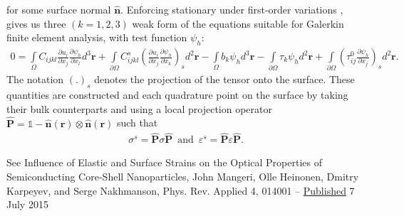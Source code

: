 \documentclass[16pt]{article} %
\begin{document}
%
for some surface normal $\mathbf{\hat{n}}$.
%
Enforcing stationary under first-order variations \cite{BowerBook}, gives us three $(k = 1,2,3)$ weak form of the equations suitable for Galerkin finite element analysis, with test function $\psi_h$:
%
\begin{align}\tag{3.8}
 0 = \int\limits_\Omega C_{ijkl} \frac{\partial u_i}{\partial x_j} \frac{\partial \psi_h}{\partial x_l} d^3 \textbf{r} + \int\limits_{\partial \Omega} C_{ijkl}^s \left(\frac{\partial u_i}{\partial x_j} \frac{\partial \psi_h}{\partial x_k} \right)_s d^2 \textbf{r} - \int\limits_\Omega b_k \psi_h d^3 \textbf{r} - \int\limits_{\partial \Omega} \tau_k \psi_h d^2 \textbf{r} + \int\limits_{\partial \Omega} \left(\tau_{ij}^0 \frac{\partial \psi_h}{\partial x_j} \right)_s d^2 \textbf{r}.
\end{align}
%
The notation $\left( . \right)_s$ denotes the projection of the tensor onto the surface.
%
These quantities are constructed and each quadrature point on the surface by taking their bulk counterparts and using a local projection operator $\mathbf{\hat{\textbf{P}}} = \mathds{1} - \mathbf{\hat{n}}(\textbf{r}) \otimes \mathbf{\hat{n}} (\textbf{r})$ \cite{Yvonnet2012} such that 
%
\begin{align}\tag{3.9}
\sigma^s = \mathbf{\hat{\textbf{P}}} \sigma \mathbf{\hat{\textbf{P}}} \,\,\,\mathrm{and}\,\,\, \varepsilon^s = \mathbf{\hat{\textbf{P}}} \varepsilon \mathbf{\hat{\textbf{P}}}.
\end{align}

See Influence of Elastic and Surface Strains on the Optical Properties of Semiconducting Core-Shell Nanoparticles,
John Mangeri, Olle Heinonen, Dmitry Karpeyev, and Serge Nakhmanson, Phys. Rev. Applied 4, 014001 -- \href{http://journals.aps.org/prapplied/abstract/10.1103/PhysRevApplied.4.014001}{Published}  7 July 2015

%
\end{document}
